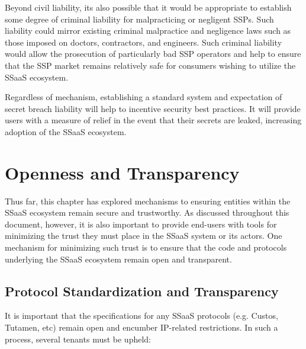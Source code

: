 Beyond civil liability, its also possible that it would be appropriate
to establish some degree of criminal liability for malpracticing or
negligent SSPs. Such liability could mirror existing criminal
malpractice and negligence laws such as those imposed on doctors,
contractors, and engineers. Such criminal liability would allow the
prosecution of particularly bad SSP operators and help to ensure that
the SSP market remains relatively safe for consumers wishing to
utilize the SSaaS ecosystem.

Regardless of mechanism, establishing a standard system and
expectation of secret breach liability will help to incentive security
best practices. It will provide users with a measure of relief in the
event that their secrets are leaked, increasing adoption of the SSaaS
ecosystem.

\section{Openness and Transparency}

Thus far, this chapter has explored mechanisms to ensuring entities
within the SSaaS ecosystem remain secure and trustworthy. As
discussed throughout this document, however, it is also important to
provide end-users with tools for minimizing the trust they must place
in the SSaaS system or its actors. One mechanism for minimizing such
trust is to ensure that the code and protocols underlying the SSaaS
ecosystem remain open and transparent.

\subsection{Protocol Standardization and Transparency}

It is important that the specifications for any SSaaS protocols
(e.g. Custos, Tutamen, etc) remain open and encumber IP-related
restrictions. In such a process, several tenants must be
upheld:


